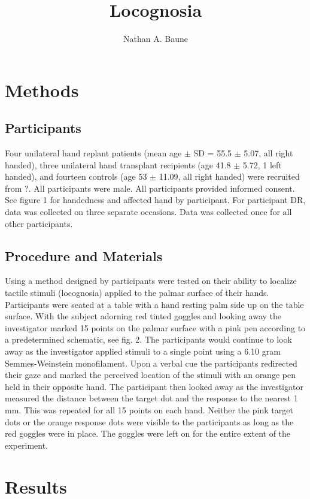 \documentclass[man, natbib]{apa6}
\title{Locognosia}
\author{Nathan A. Baune}
\affiliation{University of Missouri-Columbia}
\begin{document}
\maketitle 


\section{Methods}
\subsection{Participants}
Four unilateral hand replant patients (mean age $\pm$ SD = 55.5 $\pm$ 5.07, all right handed), three unilateral hand transplant recipients (age 41.8 $\pm$ 5.72, 1 left handed), and fourteen controls (age 53 $\pm$ 11.09, all right handed) were recruited from ?. All participants were male. All participants provided informed consent.  See figure 1 for handedness and affected hand by participant. For participant DR, data was collected on three separate occasions. Data was collected once for all other participants.

\subsection{Procedure and Materials} 
Using a method designed by \cite{noordenbos1972sensory} participants were tested on their ability to localize tactile stimuli (locognosia) applied to the palmar surface of their hands. Participants were seated at a table with a hand resting palm side up on the table surface. With the subject adorning red tinted goggles and looking away the investigator marked 15 points on the palmar surface with a pink pen according to a predetermined schematic, see fig. 2. The participants would continue to look away as the investigator applied stimuli to a single point using a 6.10 gram Semmes-Weinstein monofilament. Upon a verbal cue the participants redirected their gaze and marked the perceived location of the stimuli with an orange pen held in their opposite hand. The participant then looked away as the investigator measured the distance between the target dot and the response to the nearest 1 mm. This was repeated for all 15 points on each hand. Neither the pink target dots or the orange response dots were visible to the participants as long as the red goggles were in place. The goggles were left on for the entire extent of the experiment.
     

\section{Results}
\end{document}
